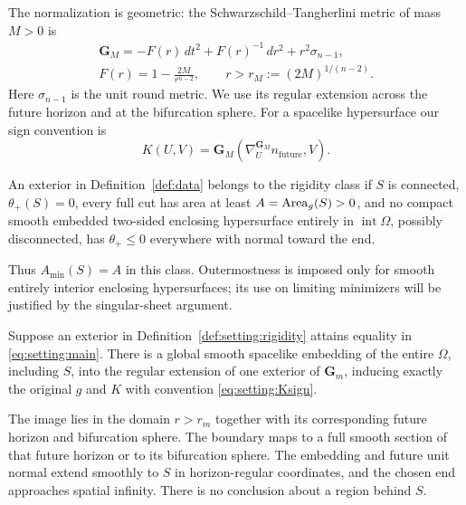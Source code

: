 The normalization is geometric: the Schwarzschild--Tangherlini metric
of mass \(M>0\) is
\begin{equation}
 \begin{gathered}
 \mathbf G_M=-F(r)\,dt^2+F(r)^{-1}\,dr^2+r^2\sigma_{n-1},\\
 F(r)=1-\frac{2M}{r^{n-2}},\qquad
 r>r_M:=(2M)^{1/(n-2)}.
 \end{gathered}
 \label{eq:setting:tangherlini}
\end{equation}
Here \(\sigma_{n-1}\) is the unit round metric. We use its regular
extension across the future horizon and at the bifurcation sphere.
For a spacelike hypersurface our sign convention is
\begin{equation}
 K(U,V)=\mathbf G_M(\nabla^{\mathbf G_M}_U n_{\mathrm{future}},V).
 \label{eq:setting:Ksign}
\end{equation}

\begin{definition}
\label{def:setting:rigidity}
An exterior in Definition~\ref{def:data} belongs to the rigidity class
if \(S\) is connected, \(\theta_+(S)=0\), every full cut has area at
least \(A=\operatorname{Area}_g(S)>0\), and no compact smooth embedded two-sided
enclosing hypersurface entirely in \(\operatorname{int}\Omega\),
possibly disconnected, has \(\theta_+\le0\) everywhere with normal
toward the end.
\end{definition}

Thus \(A_{\min}(S)=A\) in this class. Outermostness is imposed only for
smooth entirely interior enclosing hypersurfaces; its use on limiting
minimizers will be justified by the singular-sheet argument.

\begin{theorem}
\label{thm:rigidity}
Suppose an exterior in Definition~\ref{def:setting:rigidity} attains
equality in \eqref{eq:setting:main}. There is a global smooth spacelike
embedding of the entire \(\Omega\), including \(S\), into the regular
extension of one exterior of \(\mathbf G_m\), inducing exactly the
original \(g\) and \(K\) with convention \eqref{eq:setting:Ksign}.

The image lies in the domain \(r>r_m\) together with its corresponding
future horizon and bifurcation sphere. The boundary maps to a full
smooth section of that future horizon or to its bifurcation sphere.
The embedding and future unit normal extend smoothly to \(S\) in
horizon-regular coordinates, and the chosen end approaches spatial
infinity. There is no conclusion about a region behind \(S\).
\end{theorem}

